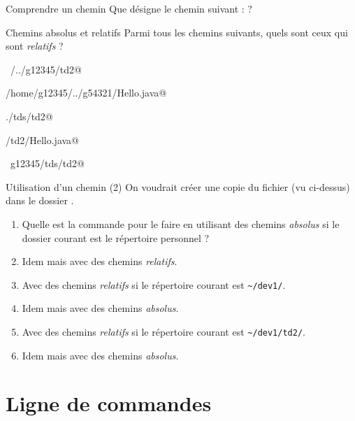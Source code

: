 \documentclass[a4paper,11pt]{style-esi/td}
\begin{document}
		\begin{Exercice}{Comprendre un chemin}
			Que désigne le chemin suivant :
			 ?
		\end{Exercice}

		\begin{Exercice}{Chemins absolus et relatifs}
			Parmi tous les chemins suivants, quels sont ceux qui sont 
			\emph{relatifs} ?			
			\begin{selectmany} 
			\item \verb@~/../g12345/td2@
			\item \verb@/home/g12345/../g54321/Hello.java@
			\item \verb@./tds/td2@
			\item \verb@tds/td2/Hello.java@
			\item \verb@~g12345/tds/td2@
			\end{selectmany} 
        \end{Exercice}

		\begin{Exercice}{Utilisation d'un chemin (2)}
			On voudrait créer une copie du fichier  (vu ci-dessus)
			dans le dossier .
			\begin{enumerate}
			\item 
				Quelle est la commande pour le faire en utilisant
				des chemins \emph{absolus} si le dossier courant
				est le répertoire personnel ?
				\textbox{2em}
			\item 
				Idem mais avec des chemins \emph{relatifs}.
				\textbox{2em}
			\item 
				Avec des chemins \emph{relatifs}
				si le répertoire courant est \verb|~/dev1/|.
				\textbox{2em}
			\item 
				Idem mais avec des chemins \emph{absolus}.
				\textbox{2em}
			\item 
				Avec des chemins \emph{relatifs}
				si le répertoire courant est \verb|~/dev1/td2/|.
				\textbox{2em}
			\item 
				Idem mais avec des chemins \emph{absolus}.
				\textbox{2em}
		\end{enumerate}
		\end{Exercice}

\section{Ligne de commandes}
\end{document}
